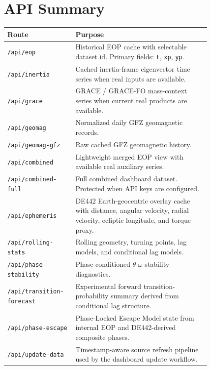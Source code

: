 \documentclass[11pt]{article}
\begin{document}
\appendix
\section{API Summary}
\begin{longtable}{p{0.22\linewidth}p{0.60\linewidth}}
\toprule
\textbf{Route} & \textbf{Purpose}\\
\midrule
\texttt{/api/eop} & Historical EOP cache with selectable dataset id. Primary fields: \texttt{t}, \texttt{xp}, \texttt{yp}.\\
\texttt{/api/inertia} & Cached inertia-frame eigenvector time series when real inputs are available.\\
\texttt{/api/grace} & GRACE / GRACE-FO mass-context series when current real products are available.\\
\texttt{/api/geomag} & Normalized daily GFZ geomagnetic records.\\
\texttt{/api/geomag-gfz} & Raw cached GFZ geomagnetic history.\\
\texttt{/api/combined} & Lightweight merged EOP view with available real auxiliary series.\\
\texttt{/api/combined-full} & Full combined dashboard dataset. Protected when API keys are configured.\\
\texttt{/api/ephemeris} & DE442 Earth-geocentric overlay cache with distance, angular velocity, radial velocity, ecliptic longitude, and torque proxy.\\
\texttt{/api/rolling-stats} & Rolling geometry, turning points, lag models, and conditional lag models.\\
\texttt{/api/phase-stability} & Phase-conditioned \(\theta\)-\(\omega\) stability diagnostics.\\
\texttt{/api/transition-forecast} & Experimental forward transition-probability summary derived from conditional lag structure.\\
\texttt{/api/phase-escape} & Phase-Locked Escape Model state from internal EOP and DE442-derived composite phases.\\
\texttt{/api/update-data} & Timestamp-aware source refresh pipeline used by the dashboard update workflow.\\
\bottomrule
\end{longtable}
\end{document}
